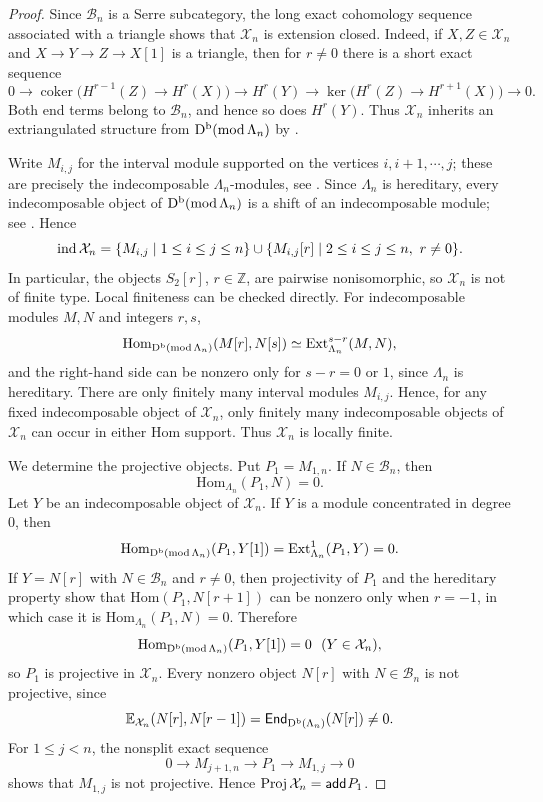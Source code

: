 \documentclass[11pt, twoside]{article}
\def\E{\mathbb{E}}
\numberwithin{equation}{section}
\newcommand{\add}{\mathsf{add}\hspace{.01in}}
\def\End{\mathsf{End}}
\def\Ext{\mbox{Ext}}
\def\Hom{\mbox{Hom}}
\begin{document}
\begin{proof}
Since $\mathcal B_n$ is a Serre subcategory, the long exact cohomology
sequence associated with a triangle shows that $\mathcal X_n$ is extension
closed.  Indeed, if $X,Z\in\mathcal X_n$ and
$X\to Y\to Z\to X[1]$ is a triangle, then for $r\ne0$ there is a short
exact sequence
\[
 0\longrightarrow
 \operatorname{coker}\bigl(H^{r-1}(Z)\to H^r(X)\bigr)
 \longrightarrow H^r(Y)\longrightarrow
 \ker\bigl(H^r(Z)\to H^{r+1}(X)\bigr)
 \longrightarrow0.
\]
Both end terms belong to $\mathcal B_n$, and hence so does $H^r(Y)$.  Thus
$\mathcal X_n$ inherits an extriangulated structure from
$\mathrm D^{\mathrm b}(\operatorname{mod}\Lambda_n)$ by \cite[Remark~2.18]{NakaokaPalu2019}.

Write $M_{i,j}$ for the interval module supported on the vertices
$i,i+1,\cdots,j$; these are precisely the indecomposable
$\Lambda_n$-modules, see \cite{ARS1995}.  Since $\Lambda_n$ is hereditary,
every indecomposable object of $\mathrm D^{\mathrm b}(\operatorname{mod}\Lambda_n)$ is a shift of an
indecomposable module; see \cite[Chapter~I, Section~5]{Happel1988}.  Hence
\[
 \operatorname{ind}\mathcal X_n=
 \{M_{i,j}\mid1\le i\le j\le n\}
 \cup
 \{M_{i,j}[r]\mid2\le i\le j\le n,\ r\ne0\}.
\]
In particular, the objects $S_2[r]$, $r\in\mathbb Z$, are pairwise
nonisomorphic, so $\mathcal X_n$ is not of finite type.  Local finiteness can
be checked directly.  For indecomposable modules $M,N$ and integers $r,s$,
\[
 \Hom_{\Db(\modcat\Lambda_n)}(M[r],N[s])
 \simeq \Ext^{s-r}_{\Lambda_n}(M,N),
\]
and the right-hand side can be nonzero only for $s-r=0$ or $1$, since
$\Lambda_n$ is hereditary.  There are only finitely many interval modules
$M_{i,j}$.  Hence, for any fixed indecomposable object of $\mathcal X_n$,
only finitely many indecomposable objects of $\mathcal X_n$ can occur in
either Hom support.  Thus $\mathcal X_n$ is locally finite.

We determine the projective objects.  Put $P_1=M_{1,n}$.  If
$N\in\mathcal B_n$, then
\[
 \Hom_{\Lambda_n}(P_1,N)=0.
\]
Let $Y$ be an indecomposable object of $\mathcal X_n$.  If $Y$ is a module
concentrated in degree $0$, then
\[
 \Hom_{\Db(\modcat\Lambda_n)}(P_1,Y[1])
 =\Ext^1_{\Lambda_n}(P_1,Y)=0.
\]
If $Y=N[r]$ with $N\in\mathcal B_n$ and $r\ne0$, then projectivity of
$P_1$ and the hereditary property show that
$\Hom(P_1,N[r+1])$ can be nonzero only when $r=-1$, in which case it is
$\Hom_{\Lambda_n}(P_1,N)=0$.  Therefore
\[
 \Hom_{\Db(\modcat\Lambda_n)}(P_1,Y[1])=0
 ~~(Y\in\mathcal X_n),
\]
so $P_1$ is projective in $\mathcal X_n$.  Every nonzero object
$N[r]$ with $N\in\mathcal B_n$ is not projective, since
\[
 \E_{\mathcal X_n}(N[r],N[r-1])
 =\End_{\Db(\Lambda_n)}(N[r])\ne0.
\]
For $1\le j<n$, the nonsplit exact sequence
\[
 0\longrightarrow M_{j+1,n}\longrightarrow P_1
 \longrightarrow M_{1,j}\longrightarrow0
\]
shows that $M_{1,j}$ is not projective.  Hence
$\Proj\mathcal X_n=\add P_1$.


\end{proof}
\end{document}

